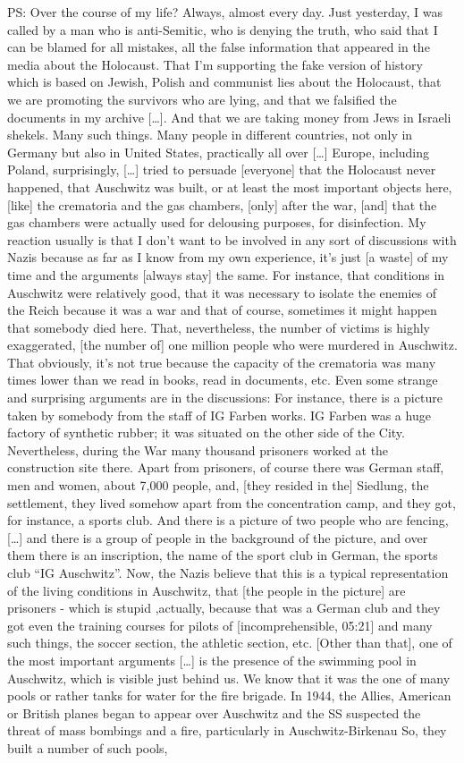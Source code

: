 PS: Over the course of my life? Always, almost every day. Just yesterday, I was called by a man who is anti-Semitic, who is denying the truth, who said that I can be blamed for all mistakes, all the false information that appeared in the media about the Holocaust. That I'm supporting the fake version of history which is based on Jewish, Polish and communist lies about the Holocaust, that we are promoting the survivors who are lying, and that we falsified the documents in my archive […]. And that we are taking money from Jews in Israeli shekels. Many such things. Many people in different countries, not only in Germany but also in United States, practically all over […] Europe, including Poland, surprisingly, […] tried to persuade [everyone] that the Holocaust never happened, that Auschwitz was built, or at least the most important objects here, [like] the crematoria and the gas chambers, [only] after the war, [and] that the gas chambers were actually used for delousing purposes, for disinfection. My reaction usually is that I don't want to be involved in any sort of discussions with Nazis because as far as I know from my own experience, it's just [a waste] of my time and the arguments [always stay] the same. For instance, that conditions in Auschwitz were relatively good, that it was necessary to isolate the enemies of the Reich because it was a war and that of course, sometimes it might happen that somebody died here. That, nevertheless, the number of victims is highly exaggerated, [the number of] one million people who were murdered in Auschwitz. That obviously, it's not true because the capacity of the crematoria was many times lower than we read in books, read in documents, etc. Even some strange and surprising arguments are in the discussions: For instance, there is a picture taken by somebody from the staff of IG Farben works. IG Farben was a huge factory of synthetic rubber; it was situated on the other side of the City. Nevertheless, during the War many thousand prisoners worked at the construction site there. Apart from prisoners, of course there was German staff, men and women, about 7,000 people, and, [they resided in the] Siedlung, the settlement, they lived somehow apart from the concentration camp, and they got, for instance, a sports club. And there is a picture of two people who are fencing, […] and there is a group of people in the background of the picture, and over them there is an inscription, the name of the sport club in German, the sports club “IG Auschwitz”. Now, the Nazis believe that this is a typical representation of the living conditions in Auschwitz, that [the people in the picture] are prisoners - which is stupid ,actually, because that was a German club and they got even the training courses for pilots of [incomprehensible, 05:21] and many such things, the soccer section, the athletic section, etc. [Other than that], one of the most important arguments […] is the presence of the swimming pool in Auschwitz, which is visible just behind us. We know that it was the one of many pools or rather tanks for water for the fire brigade. In 1944, the Allies, American or British planes began to appear over Auschwitz and the SS suspected the threat of mass bombings and a fire, particularly in Auschwitz-Birkenau So, they built a number of such pools, 